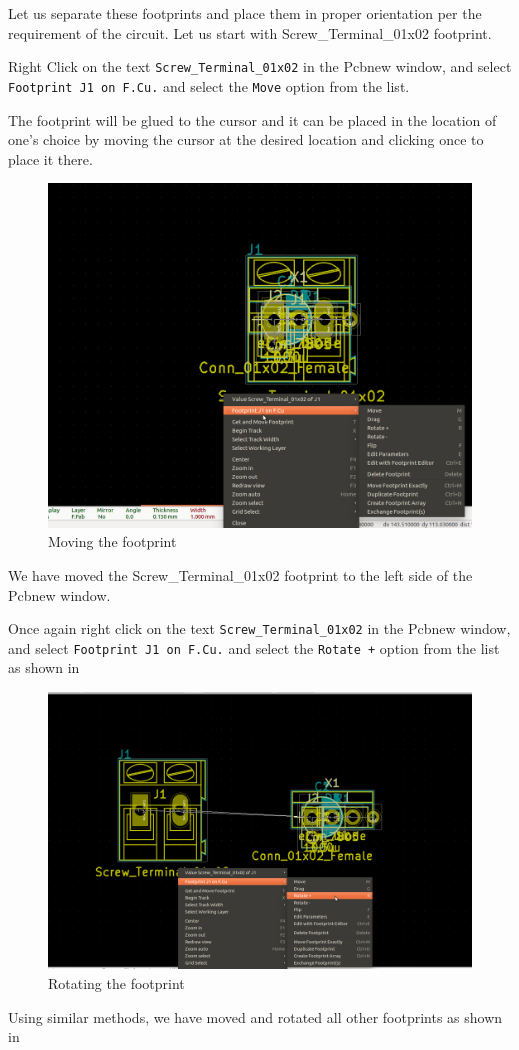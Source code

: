 \begin{compactenum}
\item Let us separate these footprints and place them in proper orientation per the requirement of the circuit. Let us start with Screw\_Terminal\_01x02 footprint.
\item Right Click on the text \texttt{Screw\_Terminal\_01x02} in the Pcbnew window, and select \texttt{Footprint J1 on F.Cu.} and select the \texttt{Move} option from the list.
\item The footprint will be glued to the cursor and it can be placed in the location of one's choice by moving the cursor at the desired location and clicking once to place it there.
\begin{figure}
\centering
\includegraphics[height=0.4\textwidth]{FPMove.png}
\caption{Moving the footprint}
\label{movingFP}
\end{figure}
\item We have moved the Screw\_Terminal\_01x02 footprint to the left side of the Pcbnew window.
\item Once again right click on the text \texttt{Screw\_Terminal\_01x02} in the Pcbnew window, and select \texttt{Footprint J1 on F.Cu.} and select the \texttt{Rotate +} option from the list as shown in 
\begin{figure}
\centering
\includegraphics[height=0.4\textwidth]{rotatefp.png}
\caption{Rotating the footprint}
\label{rotateFP}
\end{figure}
\item Using similar methods, we have moved and rotated all other footprints as shown in 


\end{compactenum}
